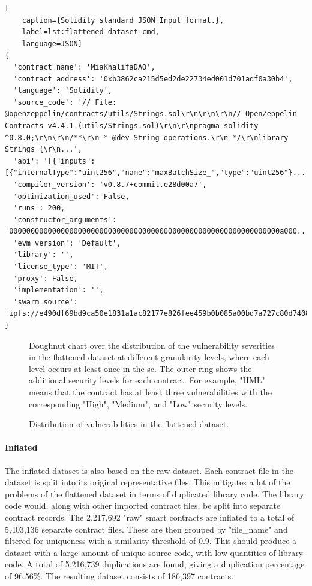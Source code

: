 \begin{lstlisting}[
    caption={Solidity standard JSON Input format.},
    label=lst:flattened-dataset-cmd,
    language=JSON]
{
  'contract_name': 'MiaKhalifaDAO',
  'contract_address': '0xb3862ca215d5ed2de22734ed001d701adf0a30b4',
  'language': 'Solidity',
  'source_code': '// File: @openzeppelin/contracts/utils/Strings.sol\r\n\r\n\r\n// OpenZeppelin Contracts v4.4.1 (utils/Strings.sol)\r\n\r\npragma solidity ^0.8.0;\r\n\r\n/**\r\n * @dev String operations.\r\n */\r\nlibrary Strings {\r\n...',
  'abi': '[{"inputs":[{"internalType":"uint256","name":"maxBatchSize_","type":"uint256"}...]',
  'compiler_version': 'v0.8.7+commit.e28d00a7',
  'optimization_used': False,
  'runs': 200,
  'constructor_arguments': '000000000000000000000000000000000000000000000000000000000000000a000...',
  'evm_version': 'Default',
  'library': '',
  'license_type': 'MIT',
  'proxy': False,
  'implementation': '',
  'swarm_source': 'ipfs://e490df69bd9ca50e1831a1ac82177e826fee459b0b085a00bd7a727c80d74089'
}
\end{lstlisting}

\begin{figure}[htbp]
    \centering
    
    \caption{Doughnut chart over the distribution of the vulnerability severities in the flattened dataset at different granularity levels, where each level occurs at least once in the \acrshort{sc}. The outer ring shows the additional security levels for each contract. For example, "HML" means that the contract has at least three vulnerabilities with the corresponding "High", "Medium", and "Low" security levels.}
\end{figure}


\begin{figure}[htbp]
    \centering
    
    \caption{Distribution of vulnerabilities in the flattened dataset.}
\end{figure}

\paragraph{Inflated}
\label{sec:verified-smart-contracts-inflated}
The inflated dataset is also based on the raw dataset. Each contract file in the dataset is split into its original representative files. This mitigates a lot of the problems of the flattened dataset in terms of duplicated library code. The library code would, along with other imported contract files, be split into separate contract records. The 2,217,692 "raw" smart contracts are inflated to a total of 5,403,136 separate contract files. These are then grouped by "file\_name" and filtered for uniqueness with a similarity threshold of 0.9. This should produce a dataset with a large amount of unique source code, with low quantities of library code. A total of 5,216,739 duplications are found, giving a duplication percentage of 96.56\%. The resulting dataset consists of 186,397 contracts.

